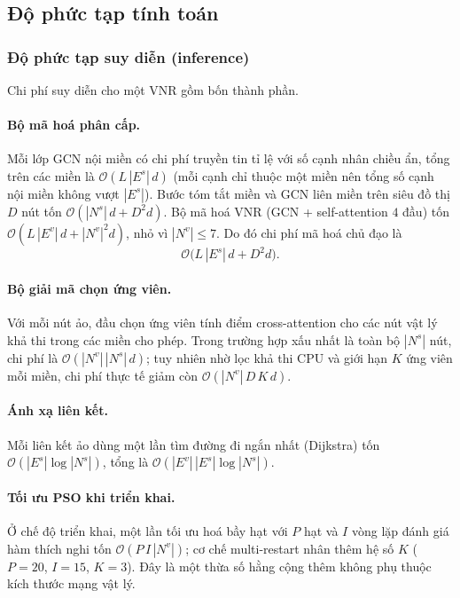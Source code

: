 \documentclass[../DoAn.tex]{subfiles}
\begin{document}
\subsection{Độ phức tạp tính toán}
\label{sec:complexity-time}

\subsubsection{Độ phức tạp suy diễn (inference)}
\label{subsec:complexity-infer}

Chi phí suy diễn cho một VNR gồm bốn thành phần.

\paragraph{Bộ mã hoá phân cấp.} Mỗi lớp GCN nội miền có chi phí truyền tin tỉ lệ với số cạnh nhân chiều ẩn, tổng trên các miền là $\mathcal{O}(L\,|E^s|\,d)$ (mỗi cạnh chỉ thuộc một miền nên tổng số cạnh nội miền không vượt $|E^s|$). Bước tóm tắt miền và GCN liên miền trên siêu đồ thị $D$ nút tốn $\mathcal{O}(|N^s|\,d + D^2 d)$. Bộ mã hoá VNR (GCN + self-attention $4$ đầu) tốn $\mathcal{O}(L\,|E^v|\,d + |N^v|^2 d)$, nhỏ vì $|N^v|\le 7$. Do đó chi phí mã hoá chủ đạo là
\begin{equation}
    \mathcal{O}\big( L\,|E^s|\,d + D^2 d \big).
    \label{eq:enc-cost}
\end{equation}

\paragraph{Bộ giải mã chọn ứng viên.} Với mỗi nút ảo, đầu chọn ứng viên tính điểm cross-attention cho các nút vật lý khả thi trong các miền cho phép. Trong trường hợp xấu nhất là toàn bộ $|N^s|$ nút, chi phí là $\mathcal{O}(|N^v|\,|N^s|\,d)$; tuy nhiên nhờ lọc khả thi CPU và giới hạn $K$ ứng viên mỗi miền, chi phí thực tế giảm còn $\mathcal{O}(|N^v|\,D\,K\,d)$.

\paragraph{Ánh xạ liên kết.} Mỗi liên kết ảo dùng một lần tìm đường đi ngắn nhất (Dijkstra) tốn $\mathcal{O}(|E^s|\log|N^s|)$, tổng là $\mathcal{O}(|E^v|\,|E^s|\log|N^s|)$.

\paragraph{Tối ưu PSO khi triển khai.} Ở chế độ triển khai, một lần tối ưu hoá bầy hạt với $P$ hạt và $I$ vòng lặp đánh giá hàm thích nghi tốn $\mathcal{O}(P\,I\,|N^v|)$; cơ chế multi-restart nhân thêm hệ số $K$ ($P=20$, $I=15$, $K=3$). Đây là một thừa số hằng cộng thêm không phụ thuộc kích thước mạng vật lý.
\end{document}
